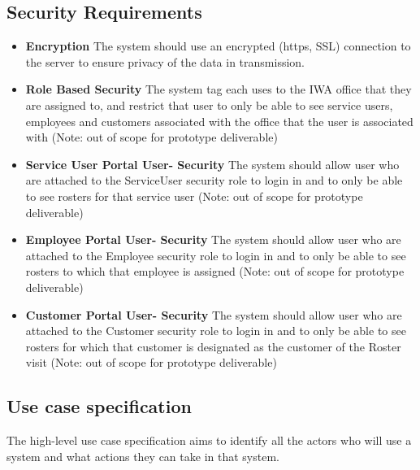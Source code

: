 \documentclass[a4paper,12pt]{article}
\begin{document}
\begin{samepage}
\subsection {Security Requirements }
\begin{itemize}
\item \textbf{Encryption} The system should use an encrypted (https, SSL) connection to the server to ensure privacy of the data in transmission.
\item \textbf{Role Based Security} The system tag each uses to the IWA office that they are assigned to, and restrict that user to only be able to see service users, employees and customers associated with the office that the user is associated with (Note: out of scope for prototype deliverable)
\newpage
\item \textbf{Service User Portal User- Security} The system should allow user who are attached to the ServiceUser security role to login in and to only be able to see rosters for that service user (Note: out of scope for prototype deliverable)
\item \textbf{Employee Portal User- Security} The system should allow user who are attached to the Employee security role to login in and to only be able to see rosters to which that employee is assigned (Note: out of scope for prototype deliverable)
\item \textbf{Customer Portal User- Security} The system should allow user who are attached to the Customer security role to login in and to only be able to see rosters for which that customer is designated as the customer of the Roster visit (Note: out of scope for prototype deliverable)
\end{itemize}

\subsection {Use case specification}
The high-level use case specification aims to identify all the actors who will use a system and what actions they can take in that system.


\end{samepage}
\end{document}
